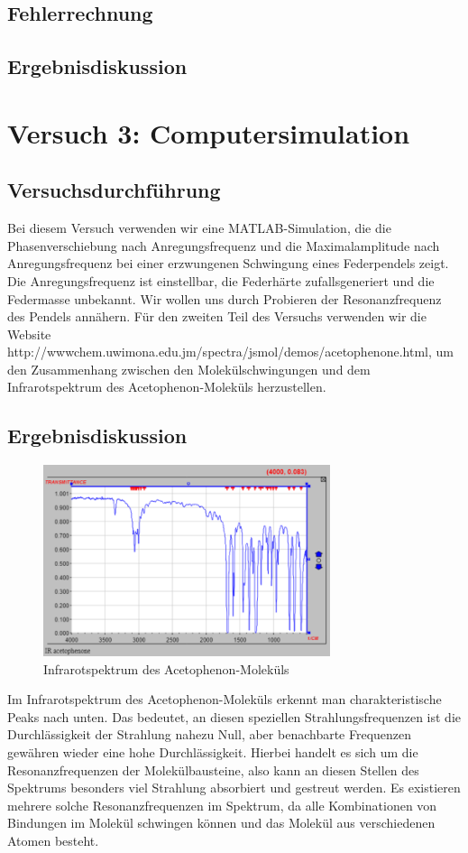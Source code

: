 \documentclass{scrartcl}
\begin{document}
\subsection{Fehlerrechnung}

\subsection{Ergebnisdiskussion}



\section{Versuch 3: Computersimulation}
\subsection{Versuchsdurchführung}
Bei diesem Versuch verwenden wir eine MATLAB-Simulation, die die Phasenverschiebung nach Anregungsfrequenz und die Maximalamplitude nach Anregungsfrequenz bei einer erzwungenen Schwingung eines Federpendels zeigt. Die Anregungsfrequenz ist einstellbar, die Federhärte zufallsgeneriert und die Federmasse unbekannt. Wir wollen uns durch Probieren der Resonanzfrequenz des Pendels annähern.
Für den zweiten Teil des Versuchs verwenden wir die \\ Website http://wwwchem.uwimona.edu.jm/spectra/jsmol/demos/acetophenone.html, um den Zusammenhang zwischen den Molekülschwingungen und dem Infrarotspektrum des Acetophenon-Moleküls herzustellen.
\subsection{Ergebnisdiskussion}

\begin{figure}[h]
  \caption{Infrarotspektrum des Acetophenon-Moleküls}
  \centering
    \includegraphics[width=0.75\textwidth]{acetophenon.png}
\end{figure}
Im Infrarotspektrum des Acetophenon-Moleküls erkennt man charakteristische Peaks nach unten. Das bedeutet, an diesen speziellen Strahlungsfrequenzen ist die Durchlässigkeit der Strahlung nahezu Null, aber benachbarte Frequenzen gewähren wieder eine hohe Durchlässigkeit. Hierbei handelt es sich um die Resonanzfrequenzen der Molekülbausteine, also kann an diesen Stellen des Spektrums besonders viel Strahlung absorbiert und gestreut werden. Es existieren mehrere solche Resonanzfrequenzen im Spektrum, da alle Kombinationen von Bindungen im Molekül schwingen können und das Molekül aus verschiedenen Atomen besteht.
\end{document}
